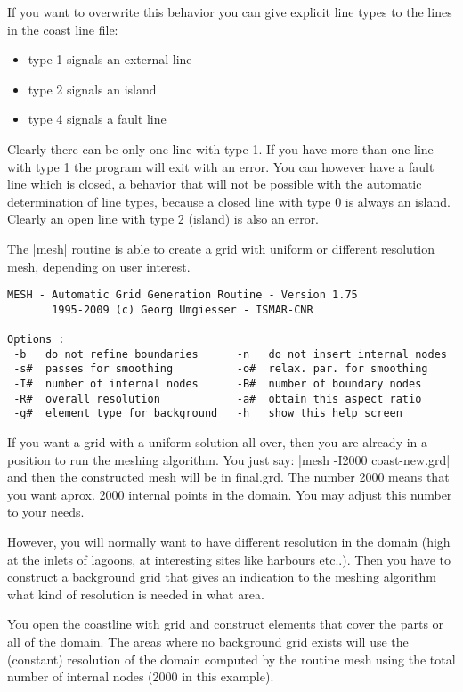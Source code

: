 If you want to overwrite this behavior you can give explicit line types to the lines in the coast line file:
\begin{itemize}
    \item     type 1 signals an external line
    \item  type 2 signals an island
    \item  type 4 signals a fault line
\end{itemize}

Clearly there can
be only one line with type 1. If you have more than one line with type
1 the program will exit with an error. You can however have a fault line
which is closed, a behavior that will not be possible with the automatic
determination of line types, because a closed line with type 0 is always
an island. Clearly an open line with type 2 (island) is also an error.


The |mesh| routine is able to create a grid with uniform or  
different resolution mesh, depending on user interest.

\begin{verbatim}
MESH - Automatic Grid Generation Routine - Version 1.75 
       1995-2009 (c) Georg Umgiesser - ISMAR-CNR        

Options :
 -b   do not refine boundaries      -n   do not insert internal nodes
 -s#  passes for smoothing          -o#  relax. par. for smoothing   
 -I#  number of internal nodes      -B#  number of boundary nodes    
 -R#  overall resolution            -a#  obtain this aspect ratio    
 -g#  element type for background   -h   show this help screen  
\end{verbatim}


If you want a grid with a uniform solution all over, then
you are already in a position to run the meshing algorithm.
You just say: |mesh -I2000 coast-new.grd| and then
the constructed mesh will be in final.grd. The number 2000
means that you want aprox. 2000 internal points in the domain.
You may adjust this number to your needs.

However, you will normally want to have different resolution
in the domain (high at the inlets of lagoons, at interesting
sites like harbours etc..). Then you have to construct a
background grid that gives an indication to the meshing
algorithm what kind of resolution is needed in what area.

You open the coastline with grid and construct elements
that cover the parts or all of the domain. The areas where
no background grid exists will use the (constant) resolution of the
domain computed by the routine mesh using the total number of
internal nodes (2000 in this example).

